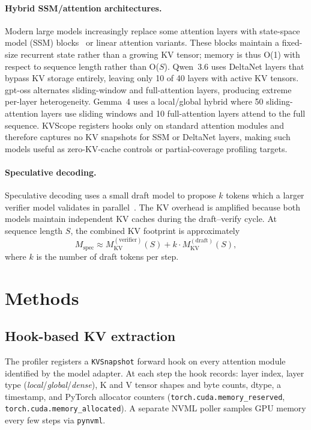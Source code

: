 \documentclass[11pt,a4paper]{article}
\newcommand{\code}[1]{\texttt{#1}}
\begin{document}
\paragraph{Hybrid SSM/attention architectures.}
Modern large models increasingly replace some attention layers with
state-space model (SSM) blocks~\cite{gu2023mamba} or linear
attention variants.
These blocks maintain a fixed-size recurrent state rather than a
growing KV tensor; memory is thus O(1) with respect to sequence
length rather than O($S$).
Qwen~3.6 uses DeltaNet layers that bypass KV storage entirely,
leaving only 10 of 40 layers with active KV tensors.
gpt-oss alternates sliding-window and full-attention layers,
producing extreme per-layer heterogeneity.
Gemma~4 uses a local/global hybrid where 50 sliding-attention
layers use sliding windows and 10 full-attention layers attend to
the full sequence.
KVScope registers hooks only on standard attention modules and
therefore captures no KV snapshots for SSM or DeltaNet layers,
making such models useful as zero-KV-cache controls or
partial-coverage profiling targets.

\paragraph{Speculative decoding.}
Speculative decoding uses a small draft model to propose $k$ tokens
which a larger verifier model validates in parallel~\cite{leviathan2023fast}.
The KV overhead is amplified because both models maintain
independent KV caches during the draft--verify cycle.
At sequence length $S$, the combined KV footprint is approximately
\begin{equation}
  M_\mathrm{spec} \approx M_\mathrm{KV}^{(\mathrm{verifier})}(S)
    + k \cdot M_\mathrm{KV}^{(\mathrm{draft})}(S),
  \label{eq:spec}
\end{equation}
where $k$ is the number of draft tokens per step.

\section{Methods}
\label{sec:methods}

\subsection{Hook-based KV extraction}
\label{sec:methods:hooks}

The profiler registers a \code{KVSnapshot} forward hook on every
attention module identified by the model adapter.
At each step the hook records: layer index, layer type
(\emph{local}/\emph{global}/\emph{dense}), K and V
tensor shapes and byte counts, dtype, a timestamp, and PyTorch
allocator counters (\code{torch.cuda.memory\_reserved},
\code{torch.cuda.memory\_allocated}).
A separate NVML poller samples GPU memory every few steps via
\texttt{pynvml}.
\end{document}

